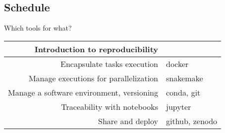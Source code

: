 \subsection*{Schedule}
\begin{frame}{Which tools for what?}
\begin{center}
\begin{tabular}{| r | l |}
\hline
    Introduction to reproducibility & \\
    \hline
    Encapsulate tasks execution & docker\\
    \hline
    Manage executions for parallelization & snakemake\\ 
    \hline
    Manage a software environment, versioning & conda, git \\
    \hline
    Traceability with notebooks & jupyter \\
    \hline
    Share and deploy & github, zenodo \\
\hline
\end{tabular}
\end{center}
\end{frame}
